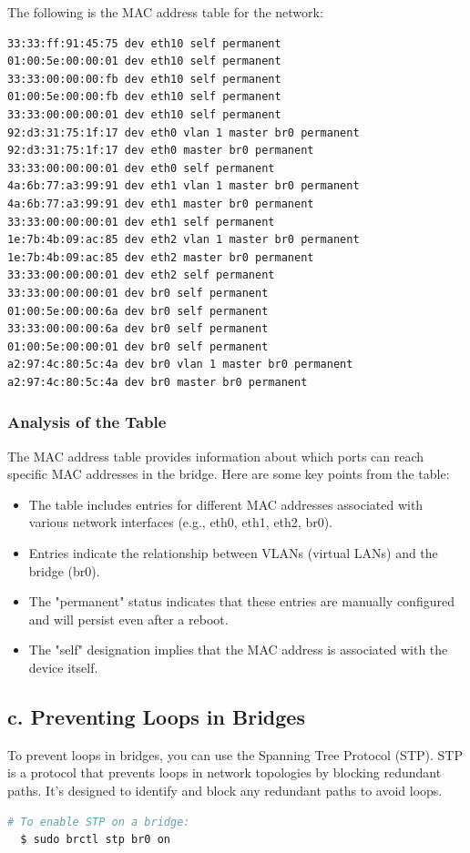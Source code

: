\documentclass{report}
\begin{document}
The following is the MAC address table for the network:

\begin{verbatim}
33:33:ff:91:45:75 dev eth10 self permanent
01:00:5e:00:00:01 dev eth10 self permanent
33:33:00:00:00:fb dev eth10 self permanent
01:00:5e:00:00:fb dev eth10 self permanent
33:33:00:00:00:01 dev eth10 self permanent
92:d3:31:75:1f:17 dev eth0 vlan 1 master br0 permanent
92:d3:31:75:1f:17 dev eth0 master br0 permanent
33:33:00:00:00:01 dev eth0 self permanent
4a:6b:77:a3:99:91 dev eth1 vlan 1 master br0 permanent
4a:6b:77:a3:99:91 dev eth1 master br0 permanent
33:33:00:00:00:01 dev eth1 self permanent
1e:7b:4b:09:ac:85 dev eth2 vlan 1 master br0 permanent
1e:7b:4b:09:ac:85 dev eth2 master br0 permanent
33:33:00:00:00:01 dev eth2 self permanent
33:33:00:00:00:01 dev br0 self permanent
01:00:5e:00:00:6a dev br0 self permanent
33:33:00:00:00:6a dev br0 self permanent
01:00:5e:00:00:01 dev br0 self permanent
a2:97:4c:80:5c:4a dev br0 vlan 1 master br0 permanent
a2:97:4c:80:5c:4a dev br0 master br0 permanent
\end{verbatim}

\subsubsection*{Analysis of the Table} 
The MAC address table provides information about which ports can reach specific MAC addresses in the bridge. Here are some key points from the table:

\begin{itemize}
  \item The table includes entries for different MAC addresses associated with various network interfaces (e.g., eth0, eth1, eth2, br0).
  \item Entries indicate the relationship between VLANs (virtual LANs) and the bridge (br0).
  \item The "permanent" status indicates that these entries are manually configured and will persist even after a reboot.
  \item The "self" designation implies that the MAC address is associated with the device itself.
\end{itemize}

\subsection*{c. Preventing Loops in Bridges}
To prevent loops in bridges, you can use the Spanning Tree Protocol (STP). STP is a protocol that prevents loops in network topologies by blocking redundant paths.
It's designed to identify and block any redundant paths to avoid loops.
\begin{lstlisting}[language=bash]
  # To enable STP on a bridge:
  $ sudo brctl stp br0 on
\end{lstlisting}
\end{document}
